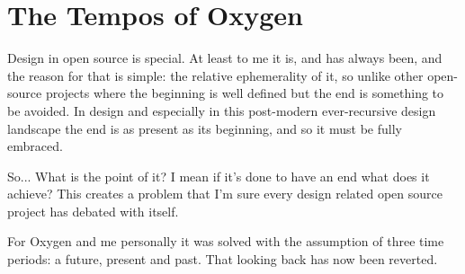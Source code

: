 

\section*{The Tempos of Oxygen}
Design in open source is special. At least to me it is, and has always been, and the reason for that is simple: the relative ephemerality of it, so unlike other open-source projects where the beginning is well defined but the end is something to be avoided. In design and especially in this post-modern ever-recursive design landscape the end is as present as its beginning, and so it must be fully embraced.

So... What is the point of it? I mean if it's done to have an end what does it achieve? This creates a problem that I'm sure every design related open source project has debated with itself.

For Oxygen and me personally it was solved with the assumption of three time periods: a future, present and past. That looking back has now been reverted.

